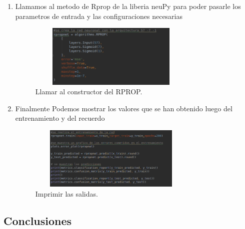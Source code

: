 \documentclass[12pt]{article}
\newcounter{subsubsubsection}[subsubsection]
\begin{document}
\begin{enumerate}
\item
Llamamos al metodo de Rprop de la liberia neuPy para poder pasarle los parametros de entrada y las configuraciones necesarias
\begin{figure}[h]
\includegraphics[width=8cm, height=3cm]{rprop_creation}
\centering
\caption{Llamar al constructor del RPROP.}
\label{fig:RPROP_READ}
\end{figure}

\clearpage
\item
Finalmente Podemos mostrar los valores que se han obtenido luego del entrenamiento y del recuerdo
 \begin{figure}[h]
\includegraphics[width=8cm, height=3cm]{rprop_finalize}
\centering
\caption{Imprimir las salidas.}
\label{fig:RPROP_READ}
\end{figure}

\end{enumerate}

\clearpage
{}

\subsection{Conclusiones}




\end{document}
